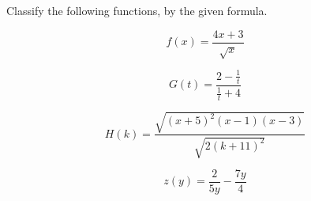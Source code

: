 \documentclass{ximera}
\author{Lee Wayand}
\begin{document}
\begin{example}




Classify the following functions, by the given formula.



\begin{question}


\[
f(x) = \frac{4x + 3}{\sqrt{x}}
\]

\begin{multipleChoice}
\end{multipleChoice}


\end{question}











\begin{question}


\[
G(t) = \frac{2 - \frac{1}{t}}{\frac{1}{t} + 4}
\]

\begin{multipleChoice}
\end{multipleChoice}


\end{question}







\begin{question}


\[
H(k) = \frac{\sqrt{(x+5)^2 (x-1) (x-3)}}{\sqrt{2(k + 11)^2}}
\]

\begin{multipleChoice}
\end{multipleChoice}


\end{question}











\begin{question}


\[
z(y) = \frac{2}{5y}  - \frac{7y}{4}
\]


\end{question}
\end{example}
\end{document}
